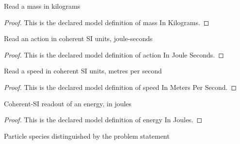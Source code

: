 \begin{definition}
  \label{def:physics:phyx-mini-0587:phyxminiproblems-problemphyxmini0587-massinkilograms}
  Read a mass in kilograms
\end{definition}
\begin{proof}
  This is the declared model definition of mass In Kilograms.
\end{proof}
\begin{definition}
  \label{def:physics:phyx-mini-0587:phyxminiproblems-problemphyxmini0587-actioninjouleseconds}
  Read an action in coherent SI units, joule-seconds
\end{definition}
\begin{proof}
  This is the declared model definition of action In Joule Seconds.
\end{proof}
\begin{definition}
  \label{def:physics:phyx-mini-0587:phyxminiproblems-problemphyxmini0587-speedinmeterspersecond}
  Read a speed in coherent SI units, metres per second
\end{definition}
\begin{proof}
  This is the declared model definition of speed In Meters Per Second.
\end{proof}
\begin{definition}
  \label{def:physics:phyx-mini-0587:phyxminiproblems-problemphyxmini0587-energyinjoules}
  Coherent-SI readout of an energy, in joules
\end{definition}
\begin{proof}
  This is the declared model definition of energy In Joules.
\end{proof}
\begin{definition}
  \label{def:physics:phyx-mini-0587:phyxminiproblems-problemphyxmini0587-particlespecies}
  Particle species distinguished by the problem statement
\end{definition}
